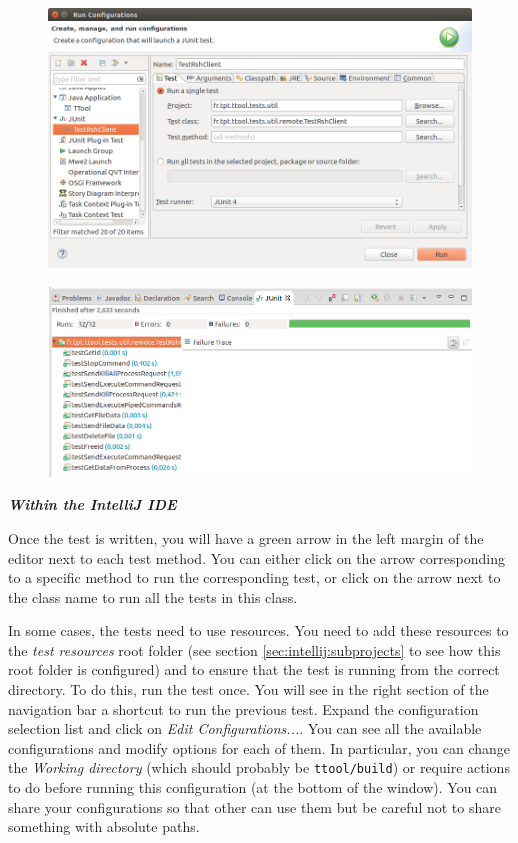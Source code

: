 \documentclass[12pt]{article}
\begin{document}
\begin{figure}[H]
\begin{center}
\includegraphics[width=\textwidth]{images/image14.png}
\end{center}
\caption{}
\label{fig:image13}
\end{figure}

\begin{figure}[H]
\begin{center}
\includegraphics[width=\textwidth]{images/image15.png}
\end{center}
\caption{}
\label{fig:image14}
\end{figure}

\textbf{\emph{Within the IntelliJ IDE}}

Once the
test is written, you will have a green arrow in the left margin of the editor
next to each test method. You can either click on the arrow corresponding to a
specific method to run the corresponding test, or click on the arrow next to the
class name to run all the tests in this class.

In some cases, the tests need to use resources. You need to add these resources
to the \emph{test resources} root folder (see section
\ref{sec:intellij:subprojects} to see how this root folder is configured) and
to ensure that the test is running from the correct directory. To do this, run
the test once. You will see in the right section of the navigation bar a
shortcut to run the previous test. Expand the configuration selection list and
click on \emph{Edit Configurations...}. You can see all the available
configurations and modify options for each of them. In particular, you can
change the \emph{Working directory} (which should probably be
\texttt{ttool/build}) or require actions to do before running this
configuration (at the bottom of the window). You can share your configurations
so that other can use them but be careful not to share something with absolute
paths.
\end{document}
